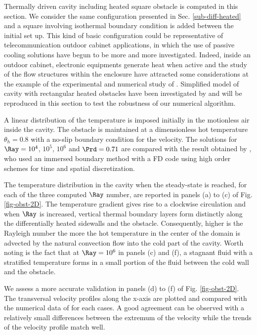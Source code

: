 Thermally driven cavity including heated square obstacle is computed in this section.
We consider the same configuration presented in Sec. \ref{sub-diff-heated} and a square involving isothermal boundary condition is added between the initial set up.
This kind of basic configuration could be representative of telecommunication outdoor cabinet applications, in which the use of passive cooling solutions have begun to be more and more investigated.
Indeed, inside an outdoor cabinet, electronic equipments generate heat when active and the study of the flow structures within the enclosure have attracted some considerations at the example of the experimental and numerical study of \cite{Raluca2013}.
Simplified model of cavity with rectangular heated obstacles have been investigated by \cite{Raluca2013} and will be reproduced in this section to test the robustness of our numerical algorithm.

A linear distribution of the temperature is imposed initially in the motionless air inside the cavity.
The obstacle is maintained at a dimensionless hot temperature $\theta_h = 0.8$ with a no-slip boundary condition for the velocity.
The solutions for $\Ray= 10^4$, $10^5$, $10^6$ and $\Prd = 0.71$ are compared with the result obtained by \cite{Raluca2013}, who used an immersed boundary method with a FD code using high order schemes for time and spatial discretization.

The temperature distribution in the cavity when the steady-state is reached, for each of the three computed $\Ray$ number, are reported in panels (a) to (c) of Fig. \ref{fig-obst-2D}.
The temperature gradient gives rise to a clockwise circulation and when $\Ray$ is increased, vertical thermal boundary layers form distinctly along the differentially heated sidewalls and the obstacle.
Consequently, 
higher is the Rayleigh number the more the hot temperature in the center of the domain is advected by the natural convection flow into the cold part of the cavity. 
Worth noting is the fact that at $\Ray = 10^6$ in panels (c) and (f), a stagnant fluid with a stratified temperature forms in a small portion of the fluid between the cold wall and the obstacle.

We assess a more accurate validation in panels (d) to (f) of Fig. \ref{fig-obst-2D}.
The transversal velocity profiles along the x-axis are plotted and compared with the numerical data of \cite{Raluca2013} for each cases. 
A good agreement can be observed with a relatively small differences between the extremum of the velocity while the trends of the velocity profile match well.

